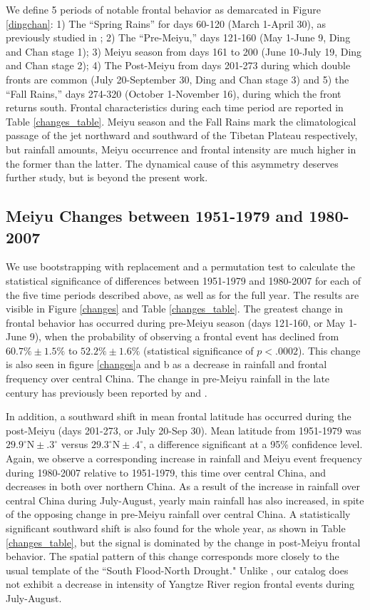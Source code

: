 \documentclass[draft,grl]{AGUTeX}
\begin{document}
\begin{article}
	We define 5 periods of notable frontal behavior as demarcated in Figure \ref{dingchan}: 1) The ``Spring Rains'' for days 60-120 (March 1-April 30), as previously studied in \citet{Tian1998}; 2) The ``Pre-Meiyu,'' days 121-160 (May 1-June 9, Ding and Chan stage 1); 3) Meiyu season from days 161 to 200 (June 10-July 19, Ding and Chan stage 2); 4) The Post-Meiyu from days 201-273 during which double fronts are common (July 20-September 30, Ding and Chan stage 3) and 5) the ``Fall Rains,'' days 274-320 (October 1-November 16), during which the front returns south. Frontal characteristics during each time period are reported in Table \ref{changes_table}. Meiyu season and the Fall Rains mark the climatological passage of the jet northward and southward of the Tibetan Plateau respectively, but rainfall amounts, Meiyu occurrence and frontal intensity are much higher in the former than the latter. The dynamical cause of this asymmetry deserves further study, but is beyond the present work.
		
\subsection{Meiyu Changes between 1951-1979 and 1980-2007}
	
	We use bootstrapping with replacement and a permutation test to calculate the statistical significance of differences between 1951-1979 and 1980-2007 for each of the five time periods described above, as well as for the full year. The results are visible in Figure \ref{changes} and Table \ref{changes_table}. The greatest change in frontal behavior has occurred during pre-Meiyu season (days 121-160, or May 1-June 9), when the probability of observing a frontal event has declined from $60.7\% \pm 1.5\%$ to $52.2\% \pm 1.6\%$ (statistical significance of $p < .0002$). This change is also seen in figure \ref{changes}a and b as a decrease in rainfall and frontal frequency over central China. The change in pre-Meiyu rainfall in the late  century has previously been reported by \citet{Xin2006} and \citet{Wang2009}.
	
	In addition, a southward shift in mean frontal latitude has occurred during the post-Meiyu (days 201-273, or July 20-Sep 30). Mean latitude from 1951-1979 was $29.9^\circ \textrm{N} \pm .3^\circ$ versus $29.3^\circ \textrm{N} \pm .4^\circ$, a difference significant at a 95\% confidence level. Again, we observe a corresponding increase in rainfall and Meiyu event frequency during 1980-2007 relative to 1951-1979, this time over central China, and decreases in both over northern China. As a result of the increase in rainfall over central China during July-August, yearly main rainfall has also increased, in spite of the opposing change in pre-Meiyu rainfall over central China. A statistically significant southward shift is also found for the whole year, as shown in Table \ref{changes_table}, but the signal is dominated by the change in post-Meiyu frontal behavior. The spatial pattern of this change corresponds more closely to the usual template of the ``South Flood-North Drought." Unlike \citep{Yu2010},  our catalog does not exhibit a decrease in intensity of Yangtze River region frontal events during July-August.
	

\end{article}
\end{document}
